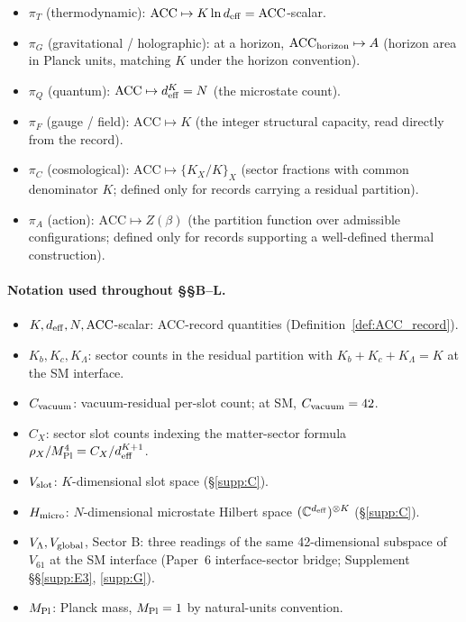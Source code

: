 \documentclass[11pt]{article}
\theoremstyle{plain}
\theoremstyle{definition}
\theoremstyle{remark}
\newcommand{\Mpl}{M_{\rm Pl}}
\begin{document}
\begin{itemize}[leftmargin=2em,itemsep=3pt]
  \item $\pi_T$ (thermodynamic): $\mathrm{ACC} \mapsto K \ln d_{\rm eff} = \mathrm{ACC}$-scalar.
  \item $\pi_G$ (gravitational / holographic): at a horizon, $\mathrm{ACC}_{\rm horizon} \mapsto A$ (horizon area in Planck units, matching $K$ under the horizon convention).
  \item $\pi_Q$ (quantum): $\mathrm{ACC} \mapsto d_{\rm eff}^K = N$ (the microstate count).
  \item $\pi_F$ (gauge / field): $\mathrm{ACC} \mapsto K$ (the integer structural capacity, read directly from the record).
  \item $\pi_C$ (cosmological): $\mathrm{ACC} \mapsto \{K_X/K\}_X$ (sector fractions with common denominator $K$; defined only for records carrying a residual partition).
  \item $\pi_A$ (action): $\mathrm{ACC} \mapsto Z(\beta)$ (the partition function over admissible configurations; defined only for records supporting a well-defined thermal construction).
\end{itemize}

\paragraph{Notation used throughout \S\S B--L.}

\begin{itemize}[leftmargin=2em,itemsep=2pt]
  \item $K, d_{\rm eff}, N, \mathrm{ACC}$-scalar: ACC-record quantities (Definition~\ref{def:ACC_record}).
  \item $K_b, K_c, K_\Lambda$: sector counts in the residual partition with $K_b + K_c + K_\Lambda = K$ at the SM interface.
  \item $C_{\rm vacuum}$: vacuum-residual per-slot count; at SM, $C_{\rm vacuum} = 42$.
  \item $C_X$: sector slot counts indexing the matter-sector formula $\rho_X / \Mpl^4 = C_X / d_{\rm eff}^{K+1}$.
  \item $V_{\rm slot}$: $K$-dimensional slot space (\S\ref{supp:C}).
  \item $H_{\rm micro}$: $N$-dimensional microstate Hilbert space $(\mathbb{C}^{d_{\rm eff}})^{\otimes K}$ (\S\ref{supp:C}).
  \item $V_\Lambda, V_{\rm global}$, Sector B: three readings of the same 42-dimensional subspace of $V_{61}$ at the SM interface (Paper~6 interface-sector bridge; Supplement \S\S\ref{supp:E3}, \ref{supp:G}).
  \item $\Mpl$: Planck mass, $\Mpl = 1$ by natural-units convention.
\end{itemize}
\end{document}

